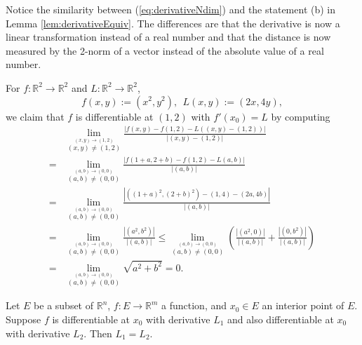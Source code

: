\begin{rem}
  Notice the similarity between (\ref{eq:derivativeNdim})
  and the statement (b) in Lemma \ref{lem:derivativeEquiv}.
  The differences are that the derivative is now a linear
  transformation instead of a real number
  and that the distance is now measured by the 2-norm of a vector
  instead of the absolute value of a real number.  
\end{rem}

\begin{exm}
  For $f: \mathbb{R}^2\rightarrow \mathbb{R}^2$
  and $L: \mathbb{R}^2\rightarrow \mathbb{R}^2$,
  \begin{equation}
    \label{eq:fSqaureComp}
    f(x,y):=(x^2, y^2), \ \ L(x,y):=(2x, 4y), 
  \end{equation}
  we claim that $f$ is differentiable at $(1,2)$
  with \mbox{$f'(x_0)=L$} by computing
  \begin{displaymath}
    \renewcommand{\arraystretch}{1.5}
    \begin{array}{rl}
    &\lim_{\stackrel{(x,y)\rightarrow (1,2)}{(x,y)\ne(1,2)}}
    \frac{|f(x,y)- f(1,2) - L((x,y)-(1,2))|}{|(x,y)-(1,2)|}
      \\
    =&\lim_{\stackrel{(a,b)\rightarrow (0,0)}{(a,b)\ne(0,0)}}
    \frac{|f(1+a,2+b)- f(1,2) - L(a,b)|}{|(a,b)|}
      \\
    =&\lim_{\stackrel{(a,b)\rightarrow (0,0)}{(a,b)\ne(0,0)}}
    \frac{|\left((1+a)^2,(2+b)^2\right)- (1,4) - (2a,4b)|}{|(a,b)|}
      \\
    =&\lim_{\stackrel{(a,b)\rightarrow (0,0)}{(a,b)\ne(0,0)}}
    \frac{|(a^2, b^2)|}{|(a,b)|}
    \le \lim_{\stackrel{(a,b)\rightarrow (0,0)}{(a,b)\ne(0,0)}}
          \left(\frac{|(a^2, 0)|}{|(a,b)|}
          +  \frac{|(0, b^2)|}{|(a,b)|}\right)
      \\
    = &\lim_{\stackrel{(a,b)\rightarrow (0,0)}{(a,b)\ne(0,0)}}
        \sqrt{a^2 + b^2}
    = 0.
    \end{array}
  \end{displaymath}
\end{exm}

\begin{lem}
  \label{lem:uniquenessOfDerivatives}
  Let $E$ be a subset of $\mathbb{R}^n$,
  $f: E\rightarrow \mathbb{R}^m$ a function,
  and $x_0\in E$ an interior point of $E$.
  Suppose $f$ is differentiable at $x_0$ with derivative $L_1$
  and also differentiable at $x_0$ with derivative $L_2$.
  Then $L_1=L_2$.
\end{lem}

